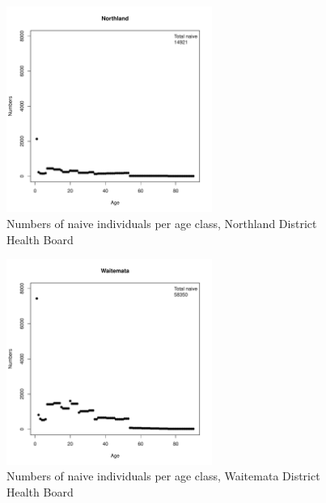 \documentclass{article}
\begin{document}
\begin{figure}
     \begin{center}
     \includegraphics[width=0.6\textwidth]{dhb1.pdf}
     \end{center}
     \caption{Numbers of naive individuals per age class, Northland District Health Board}
     \label{fig:Northland}
\end{figure}


\begin{figure}
     \begin{center}
     \includegraphics[width=0.6\textwidth]{dhb2.pdf}
     \end{center}
     \caption{Numbers of naive individuals per age class, Waitemata District Health Board}
     \label{fig:Waitemata}
\end{figure}
\end{document}
